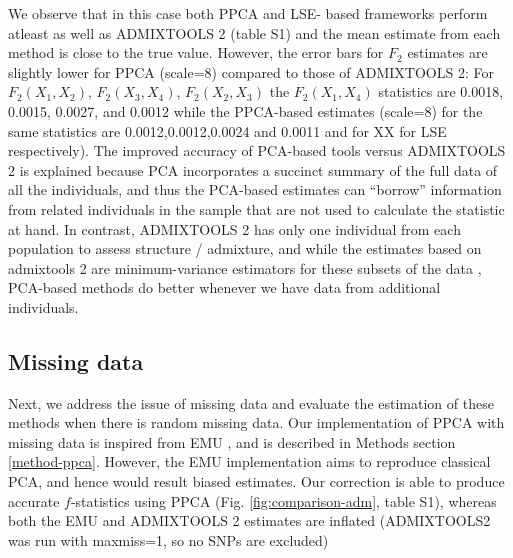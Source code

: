 \documentclass[12pt, letterpaper]{article}
\begin{document}
We observe that in this case both PPCA and LSE- based frameworks perform atleast as well as ADMIXTOOLS 2 (table S1) and the mean estimate from each method is close to the true value. However, the error bars for $F_2$ estimates are slightly lower for PPCA (scale=8) compared to those of ADMIXTOOLS 2: For $F_2(X_1,X_2)$, $F_2(X_3,X_4)$, $F_2(X_2,X_3)$ the $F_2(X_1,X_4)$ statistics are 0.0018, 0.0015, 0.0027, and 0.0012 while the PPCA-based estimates (scale=8) for the same statistics are 0.0012,0.0012,0.0024 and 0.0011 and for XX for LSE respectively). The improved accuracy of PCA-based tools versus ADMIXTOOLS 2 is explained because PCA incorporates a succinct summary of the full data of all the individuals, and thus the PCA-based estimates can ``borrow'' information from related individuals in the sample that are not used to calculate the statistic at hand. In contrast, ADMIXTOOLS 2 has only one individual from each population to assess structure / admixture, and while the estimates based on admixtools 2 are minimum-variance estimators for these subsets of the data \citep{patterson_ancient_2012}, PCA-based methods do better whenever we have data from additional individuals.

\subsection{Missing data}
Next, we address the issue of missing data and evaluate the estimation of these methods when there is random missing data. Our implementation of PPCA with missing data is inspired from EMU \cite{meisner_large-scale_2021}, and is described in Methods section \ref{method-ppca}. However, the EMU implementation aims to reproduce classical PCA, and hence would result biased estimates. Our correction is able to produce accurate $f$-statistics using PPCA (Fig. \ref{fig:comparison-adm}, table S1), whereas both the EMU and  ADMIXTOOLS 2 estimates are inflated (ADMIXTOOLS2 was run with maxmiss=1, so no SNPs are excluded) 
\end{document}
